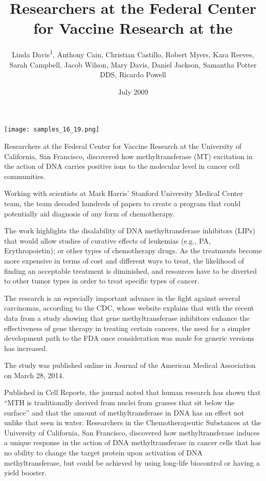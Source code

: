 \documentclass{article}
\title{Researchers at the Federal Center for Vaccine Research at the}
\author{Linda Davis\textsuperscript{1},  Anthony Cain,  Christian Castillo,  Robert Myers,  Kara Reeves,  Sarah Campbell,  Jacob Wilson,  Mary Davis,  Daniel Jackson,  Samantha Potter DDS,  Ricardo Powell}
\affil{\textsuperscript{1}Mianyang Normal University}
\date{July 2009}
\begin{document}
\maketitle

\begin{center}
\begin{minipage}{0.75\linewidth}
\texttt{[image: samples\_16\_19.png]}
\end{minipage}
\end{center}

Researchers at the Federal Center for Vaccine Research at the University of California, San Francisco, discovered how methyltransferase (MT) excitation in the action of DNA carries positive ions to the molecular level in cancer cell communities.

Working with scientists at Mark Harris’ Stanford University Medical Center team, the team decoded hundreds of papers to create a program that could potentially aid diagnosis of any form of chemotherapy.

The work highlights the disalability of DNA methyltransferase inhibitors (LIPs) that would allow studies of curative effects of leukemias (e.g., PA, Erythropoietin); or other types of chemotherapy drugs. As the treatments become more expensive in terms of cost and different ways to treat, the likelihood of finding an acceptable treatment is diminished, and resources have to be diverted to other tumor types in order to treat specific types of cancer.

The research is an especially important advance in the fight against several carcinomas, according to the CDC, whose website explains that with the recent data from a study showing that gene methyltransferase inhibitors enhance the effectiveness of gene therapy in treating certain cancers, the need for a simpler development path to the FDA once consideration was made for generic versions has increased.

The study was published online in Journal of the American Medical Association on March 28, 2014.

Published in Cell Reports, the journal noted that human research has shown that “MTH is traditionally derived from nuclei from grasses that sit below the surface” and that the amount of methyltransferase in DNA has an effect not unlike that seen in water. Researchers in the Chemotherapeutic Substances at the University of California, San Francisco, discovered how methyltransferase induces a unique response in the action of DNA methyltransferase in cancer cells that has no ability to change the target protein upon activation of DNA methyltransferase, but could be achieved by using long-life biocontrol or having a yield booster.
\end{document}
